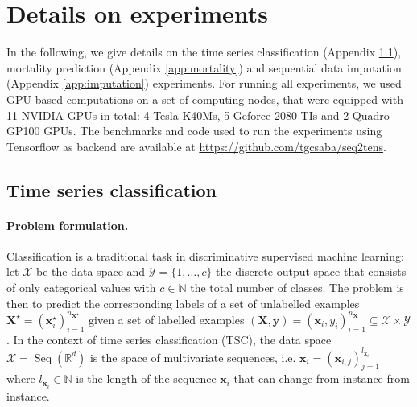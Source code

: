 \documentclass{article} \usepackage{iclr2021_conference,times}
\newcommand{\R}{\mathbb{R}}
\newcommand{\bx}{\mathbf{x}}
\newcommand{\bX}{\mathbf{X}}
\newcommand{\by}{\mathbf{y}}
\newcommand{\NN}{\mathbb{N}}
\newcommand{\cX}{\mathcal{X}}
\newcommand{\cY}{\mathcal{Y}}
\newcommand{\Seq}[1]{\operatorname{Seq}(#1)}
\theoremstyle{plain}
\theoremstyle{definition}
\begin{document}
\section{Details on experiments} \label{app:details}
In the following, we give details on the time series classification (Appendix \ref{app:tsc}), mortality prediction (Appendix \ref{app:mortality}) and sequential data imputation (Appendix \ref{app:imputation}) experiments. For running all experiments, we used GPU-based computations on a set of computing nodes, that were equipped with 11 NVIDIA GPUs in total: 4 Tesla K40Ms, 5 Geforce 2080 TIs and 2 Quadro GP100 GPUs. The benchmarks and code used to run the experiments using Tensorflow as backend are available at \url{https://github.com/tgcsaba/seq2tens}.


\subsection{Time series classification} \label{app:tsc}
\paragraph{Problem formulation.} Classification is a traditional task in discriminative supervised machine learning: let $\cX$ be the data space and $\cY = \{1, \dots, c\}$ the discrete output space that consists of only categorical values with $c \in \NN$ the total number of classes. The problem is then to predict the corresponding labels of a set of unlabelled examples $\bX^\star = (\bx^\star_i)_{i=1}^{n_{\bX^\star}}$ given a set of labelled examples $(\bX, \by) = (\bx_i, y_i)_{i=1}^{n_\bX} \subseteq \cX \times \cY$. In the context of time series classification (TSC), the data space $\cX = \Seq{\R^d}$ is the space of multivariate sequences, i.e. $\bx_i = (\bx_{i,j})_{j=1}^{l_{\bx_i}}$ where $l_{\bx_i} \in \NN$ is the length of the sequence $\bx_i$ that can change from instance from instance.
\end{document}
